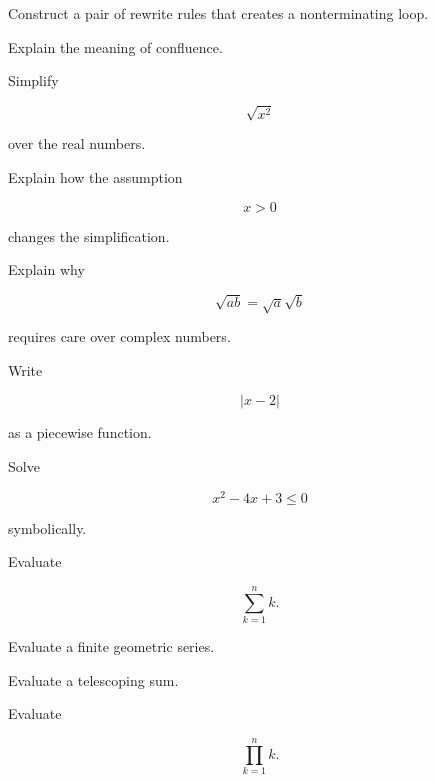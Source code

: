 \begin{exercise}[3]
Construct a pair of rewrite rules that creates a nonterminating loop.
\end{exercise}

\begin{exercise}[3]
Explain the meaning of confluence.
\end{exercise}

\begin{exercise}[2]
Simplify

\[
\sqrt{x^2}
\]

over the real numbers.
\end{exercise}

\begin{exercise}[3]
Explain how the assumption

\[
x>0
\]

changes the simplification.
\end{exercise}

\begin{exercise}[3]
Explain why

\[
\sqrt{ab}
=
\sqrt{a}\sqrt{b}
\]

requires care over complex numbers.
\end{exercise}

\begin{exercise}[3]
Write

\[
|x-2|
\]

as a piecewise function.
\end{exercise}

\begin{exercise}[3]
Solve

\[
x^2-4x+3\leq0
\]

symbolically.
\end{exercise}

\begin{exercise}[2]
Evaluate

\[
\sum_{k=1}^{n}k.
\]
\end{exercise}

\begin{exercise}[3]
Evaluate a finite geometric series.
\end{exercise}

\begin{exercise}[3]
Evaluate a telescoping sum.
\end{exercise}

\begin{exercise}[2]
Evaluate

\[
\prod_{k=1}^{n}k.
\]
\end{exercise}

